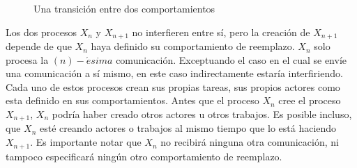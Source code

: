 \begin{figure}[H]
\caption{Una transición entre dos comportamientos}
\label{fig:actortransition}
\end{figure}
Los dos procesos $X_n$ y $X_{n+1}$ no interfieren entre sí, pero la creación de $X_{n+1}$ depende de que $X_{n}$ haya definido su comportamiento de reemplazo. $X_n$ solo procesa la $(n)-\acute{e}sima$ comunicación. Exceptuando el caso en el cual se envíe una comunicación a sí mismo, en este caso indirectamente estaría interfiriendo. Cada uno de estos procesos crean sus propias tareas, sus propios actores como esta definido en sus comportamientos. Antes que el proceso $X_n$ cree el proceso $X_{n+1}$, $X_n$ podría haber creado otros actores u otros trabajos. Es posible incluso, que $X_n$ esté creando actores o trabajos al mismo tiempo que lo está haciendo $X_{n+1}$. Es importante notar que $X_n$ no recibirá ninguna otra comunicación, ni tampoco especificará ningún otro comportamiento de reemplazo.


